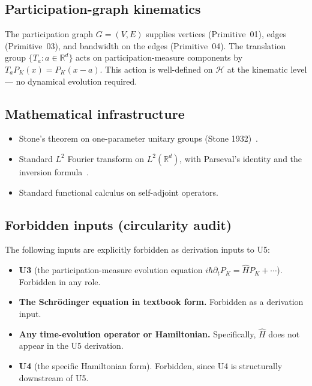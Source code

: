 \documentclass[11pt,a4paper]{article}
\begin{document}
\subsection{Participation-graph kinematics}

The participation graph $G = (V, E)$ supplies vertices (Primitive~01), edges (Primitive~03), and bandwidth on the edges (Primitive~04). The translation group $\{T_a : a \in \mathbb{R}^d\}$ acts on participation-measure components by $T_a P_K(x) = P_K(x - a)$. This action is well-defined on $\mathcal{H}$ at the kinematic level --- no dynamical evolution required.

\subsection{Mathematical infrastructure}

\begin{itemize}
  \item Stone's theorem on one-parameter unitary groups (Stone 1932)~\cite{stone}.
  \item Standard $L^2$ Fourier transform on $L^2(\mathbb{R}^d)$, with Parseval's identity and the inversion formula~\cite{reedsimon}.
  \item Standard functional calculus on self-adjoint operators.
\end{itemize}

\subsection{Forbidden inputs (circularity audit)}\label{sec:forbidden}

The following inputs are explicitly forbidden as derivation inputs to U5:

\begin{itemize}
  \item \textbf{U3} (the participation-measure evolution equation $i\hbar \partial_t P_K = \hat{H} P_K + \cdots$). Forbidden in any role.
  \item \textbf{The Schr\"odinger equation in textbook form.} Forbidden as a derivation input.
  \item \textbf{Any time-evolution operator or Hamiltonian.} Specifically, $\hat{H}$ does not appear in the U5 derivation.
  \item \textbf{U4} (the specific Hamiltonian form). Forbidden, since U4 is structurally downstream of U5.
\end{itemize}
\end{document}
